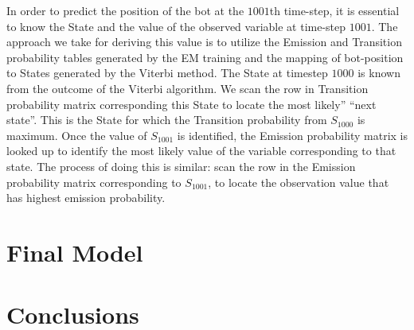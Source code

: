 \documentclass[twoside]{article}
\begin{document}
In order to predict the position of the bot at the $\num{1001}$th time-step, it is essential to know the State and the value of the observed variable at time-step $\num{1001}$.
The approach we take for deriving this value is to utilize the Emission and Transition probability tables generated by the EM training and the mapping of bot-position to States generated by the Viterbi method.
The State at timestep $\num{1000}$ is known from the outcome of the Viterbi algorithm.
We scan the row in Transition probability matrix corresponding this State to locate the most likely'' ``next state''.
This is the State for which the Transition probability from $S_{\num{1000}}$ is maximum.
Once the value of $S_{\num{1001}}$ is identified, the Emission probability matrix is looked up to identify the most likely value of the variable corresponding to that state.
The process of doing this is similar: scan the row in the Emission probability matrix corresponding to $S_{\num{1001}}$, to locate the observation value that has highest emission probability.

\section{Final Model}\label{sec:final-model}

\section{Conclusions}\label{sec:conclusions}
\end{document}

